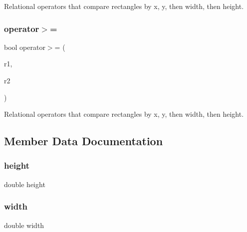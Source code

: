 Relational operators that compare rectangles by x, y, then width, then height. 

\mbox{\label{structGRectangle_a206b248cb2a1fdece41beb61e5d41904}} 
\subsubsection{\texorpdfstring{operator$>$=}{operator>=}}
{\footnotesize\ttfamily bool operator$>$= (\begin{DoxyParamCaption}\item[{const \mbox{\hyperlink{structGRectangle}{G\+Rectangle}} \&}]{r1,  }\item[{const \mbox{\hyperlink{structGRectangle}{G\+Rectangle}} \&}]{r2 }\end{DoxyParamCaption})\hspace{0.3cm}{\ttfamily [friend]}}



Relational operators that compare rectangles by x, y, then width, then height. 



\subsection{Member Data Documentation}
\mbox{\label{structGRectangle_a89f6abd564014faeff7cd20c340a9c7d}} 
\subsubsection{\texorpdfstring{height}{height}}
{\footnotesize\ttfamily double height}

\mbox{\label{structGRectangle_a9df23e056f5d1a0388cd8190431c0e03}} 
\subsubsection{\texorpdfstring{width}{width}}
{\footnotesize\ttfamily double width}

\mbox{\label{structGRectangle_af88b946fb90d5f08b5fb740c70e98c10}} 
